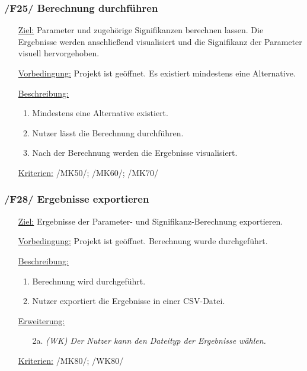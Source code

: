 \documentclass{article}
\begin{document}
\subsubsection*{\textbf{/F25/} Berechnung durchführen} \label{sec:f:Berechnung durchführen}
\begin{itemize}
    \item[\underline{Ziel:}] Parameter und zugehörige Signifikanzen berechnen lassen. Die Ergebnisse werden anschließend visualisiert und die Signifikanz der Parameter visuell hervorgehoben.
    \item[\underline{Vorbedingung:}] Projekt ist geöffnet. Es existiert mindestens eine Alternative.
    \item[\underline{Beschreibung:}]
    \begin{enumerate}
        \item Mindestens eine Alternative existiert.
        \item Nutzer lässt die Berechnung durchführen.
        \item Nach der Berechnung werden die Ergebnisse visualisiert.
    \end{enumerate}
    \item[\underline{Kriterien:}] /MK50/; /MK60/; /MK70/ 
\end{itemize} 

\subsubsection*{\textbf{/F28/} Ergebnisse exportieren} \label{sec:f:Ergebnisse exportieren}
\begin{itemize}
    \item[\underline{Ziel:}] Ergebnisse der Parameter- und Signifikanz-Berechnung exportieren.
    \item[\underline{Vorbedingung:}] Projekt ist geöffnet. Berechnung wurde durchgeführt.
    \item[\underline{Beschreibung:}]
    \begin{enumerate}
        \item Berechnung wird durchgeführt.
        \item Nutzer exportiert die Ergebnisse in einer CSV-Datei.
    \end{enumerate}
    \item[\underline{Erweiterung:}]
    \begin{itemize}
        \item[2a.] \textit{(WK) Der Nutzer kann den Dateityp der Ergebnisse wählen.}
    \end{itemize}
    \item[\underline{Kriterien:}] /MK80/; /WK80/
\end{itemize}
\end{document}
